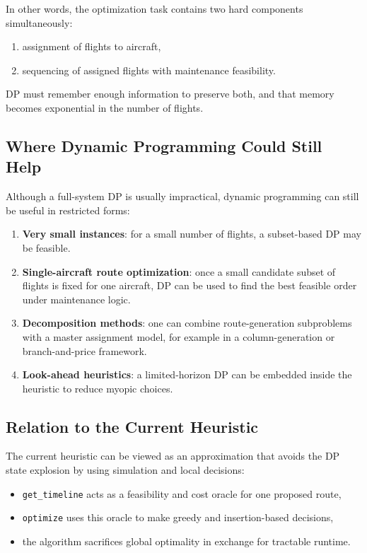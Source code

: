 \documentclass[11pt,a4paper]{article}
\begin{document}
In other words, the optimization task contains two hard components simultaneously:
\begin{enumerate}[leftmargin=1.4em]
    \item assignment of flights to aircraft,
    \item sequencing of assigned flights with maintenance feasibility.
\end{enumerate}
DP must remember enough information to preserve both, and that memory becomes exponential in the number of flights.

\subsection{Where Dynamic Programming Could Still Help}
Although a full-system DP is usually impractical, dynamic programming can still be useful in restricted forms:
\begin{enumerate}[leftmargin=1.4em]
    \item \textbf{Very small instances}: for a small number of flights, a subset-based DP may be feasible.
    \item \textbf{Single-aircraft route optimization}: once a small candidate subset of flights is fixed for one aircraft, DP can be used to find the best feasible order under maintenance logic.
    \item \textbf{Decomposition methods}: one can combine route-generation subproblems with a master assignment model, for example in a column-generation or branch-and-price framework.
    \item \textbf{Look-ahead heuristics}: a limited-horizon DP can be embedded inside the heuristic to reduce myopic choices.
\end{enumerate}

\subsection{Relation to the Current Heuristic}
The current heuristic can be viewed as an approximation that avoids the DP state explosion by using simulation and local decisions:
\begin{itemize}[leftmargin=1.4em]
    \item \texttt{get\_timeline} acts as a feasibility and cost oracle for one proposed route,
    \item \texttt{optimize} uses this oracle to make greedy and insertion-based decisions,
    \item the algorithm sacrifices global optimality in exchange for tractable runtime.
\end{itemize}
\end{document}
